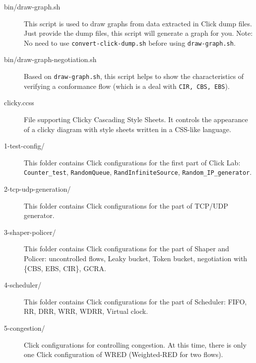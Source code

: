 \documentclass[a4paper]{article}
\begin{document}
\begin{description}
      	\item[bin/draw-graph.sh] This script is used to draw graphs from data extracted in Click dump files. Just provide the dump files, this script will generate a graph for you. Note: No need to use \texttt{convert-click-dump.sh} before using \texttt{draw-graph.sh}.
      	\item[bin/draw-graph-negotiation.sh] Based on \texttt{draw-graph.sh}, this script helps to show the characteristics of verifying a conformance flow (which is a deal with \texttt{CIR, CBS, EBS}).
      	\item[clicky.ccss] File supporting Clicky Cascading Style Sheets. It controls the appearance of a clicky diagram with style sheets written in a CSS-like language.      	
      	\item[1-test-config/] This folder contains Click configurations for the first part of Click Lab: \texttt{Counter\_test}, \texttt{RandomQueue}, \texttt{RandInfiniteSource}, \texttt{Random\_IP\_generator}.
      	\item[2-tcp-udp-generation/] This folder contains Click configurations for the part of TCP/UDP generator.
      	\item[3-shaper-policer/] This folder contains Click configurations for the part of Shaper and Policer: uncontrolled flows, Leaky bucket, Token bucket, negotiation with \{CBS, EBS, CIR\}, GCRA.
      	\item[4-scheduler/] This folder contains Click configurations for the part of Scheduler: FIFO, RR, DRR, WRR, WDRR, Virtual clock.
      	\item[5-congestion/] Click configurations for controlling congestion. At this time, there is only one Click configuration of WRED (Weighted-RED for two flows).
      \end{description}
    
\end{document}
